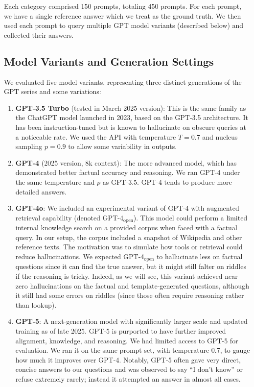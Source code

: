 \documentclass{article}
\begin{document}
Each category comprised 150 prompts, totaling 450 prompts. For each prompt, we have a single reference answer which we treat as the ground truth. We then used each prompt to query multiple GPT model variants (described below) and collected their answers.

\subsection{Model Variants and Generation Settings}
We evaluated five model variants, representing three distinct generations of the GPT series and some variations:
\begin{enumerate}
    \item \textbf{GPT-3.5 Turbo} (tested in March 2025 version): This is the same family as the ChatGPT model launched in 2023, based on the GPT-3.5 architecture. It has been instruction-tuned but is known to hallucinate on obscure queries at a noticeable rate. We used the API with temperature $T=0.7$ and nucleus sampling $p=0.9$ to allow some variability in outputs.
    \item \textbf{GPT-4} (2025 version, 8k context): The more advanced model, which has demonstrated better factual accuracy and reasoning. We ran GPT-4 under the same temperature and $p$ as GPT-3.5. GPT-4 tends to produce more detailed answers.
    \item \textbf{GPT-4o}: We included an experimental variant of GPT-4 with augmented retrieval capability (denoted GPT-4$_\text{open}$). This model could perform a limited internal knowledge search on a provided corpus when faced with a factual query. In our setup, the corpus included a snapshot of Wikipedia and other reference texts. The motivation was to simulate how tools or retrieval could reduce hallucinations. We expected GPT-4$_\text{open}$ to hallucinate less on factual questions since it can find the true answer, but it might still falter on riddles if the reasoning is tricky. Indeed, as we will see, this variant achieved near zero hallucinations on the factual and template-generated questions, although it still had some errors on riddles (since those often require reasoning rather than lookup).
    \item \textbf{GPT-5}: A next-generation model with significantly larger scale and updated training as of late 2025. GPT-5 is purported to have further improved alignment, knowledge, and reasoning. We had limited access to GPT-5 for evaluation. We ran it on the same prompt set, with temperature 0.7, to gauge how much it improves over GPT-4. Notably, GPT-5 often gave very direct, concise answers to our questions and was observed to say “I don't know” or refuse extremely rarely; instead it attempted an answer in almost all cases.

\end{enumerate}
\end{document}
